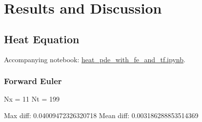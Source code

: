 \section{Results and Discussion}\label{sec:Results}

\subsection{Heat Equation}\label{sec:heateq results}
Accompanying notebook: \href{https://github.com/nicolossus/FYS-STK4155-Project3/blob/master/notebooks/heat_pde_with_fe_and_tf.ipynb}{heat\_pde\_with\_fe\_and\_tf.ipynb}.

\subsubsection{Forward Euler}
Nx = 11
Nt = 199

Max diff: 0.04009472326320718
Mean diff: 0.003186288853514369

